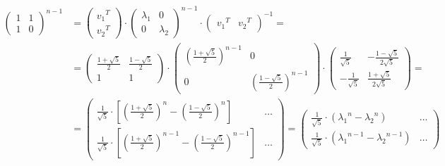 \begin{align*}
	\begin{pmatrix} 1 & 1 \\ 1 & 0 \end{pmatrix}^{n-1} &= \begin{pmatrix} {v_1}^T \\ {v_2}^T \end{pmatrix} \cdot \begin{pmatrix} \lambda_1 & 0 \\ 0 & \lambda_2 \end{pmatrix}^{n-1} \cdot \begin{pmatrix} {v_1}^T & {v_2}^T \end{pmatrix}^{-1} = \\
	&= \begin{pmatrix} \frac{1 + \sqrt{5}}{2} & \frac{1 - \sqrt{5}}{2} \\[8pt] 1 & 1 \end{pmatrix} \cdot \begin{pmatrix} \left(\frac{1 + \sqrt{5}}{2}\right)^{n-1} & 0 \\[-2pt] 0 & \left(\frac{1 - \sqrt{5}}{2}\right)^{n-1} \end{pmatrix} \cdot \begin{pmatrix} \frac{1}{\sqrt{5}} & -\frac{1 - \sqrt{5}}{2\sqrt{5}} \\[8pt] -\frac{1}{\sqrt{5}} & \frac{1 + \sqrt{5}}{2\sqrt{5}} \end{pmatrix} = \\
	&= \begin{pmatrix} \frac{1}{\sqrt{5}} \cdot \left[ \left(\frac{1 + \sqrt{5}}{2}\right)^n - \left(\frac{1 - \sqrt{5}}{2}\right)^n \right] & \dots \\[8pt] \frac{1}{\sqrt{5}} \cdot \left[ \left(\frac{1 + \sqrt{5}}{2}\right)^{n-1} - \left(\frac{1 - \sqrt{5}}{2}\right)^{n-1} \right] & \dots \end{pmatrix} = \begin{pmatrix} \frac{1}{\sqrt{5}} \cdot \left( {\lambda_1}^n - {\lambda_2}^n \right) & \dots \\[8pt] \frac{1}{\sqrt{5}} \cdot \left( {\lambda_1}^{n-1} - {\lambda_2}^{n-1} \right) & \dots \end{pmatrix}
\end{align*}
